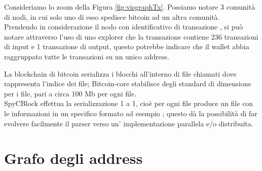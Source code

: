 \begin{example}
Consideriamo lo zoom  della Figura \ref{fig:visgraphTx}. Possiamo notare 3 comunità di nodi, in cui solo uno di esso spedisce bitcoin ad un altra comunità.\\
  Prendendo in considerazione il nodo con  identificativo di transazione , si può notare attraverso l'uso di uno explorer che la transazione contiene 236 transazioni di input e 1 transazione di output, questo potrebbe indicare che il wallet abbia raggruppato tutte le transazioni su un unico address.
\end{example}

La blockchain di bitcoin serializza i blocchi all'interno di file chiamati  dove  rappresenta l'indice dei file; Bitcoin-core stabilisce degli standard di dimensione per i file, pari a circa 100 Mb per ogni file.\\
SpyCBlock effettua la serializzazione 1 a 1, cioè per ogni file  produce un file con le informazioni in un specifico formato ad esempio ; questo dà la possibilità di far evolvere facilmente il parser verso un' implementazione parallela e/o distribuita.

\section{Grafo degli address} \label{sec:solGraphAddress}

